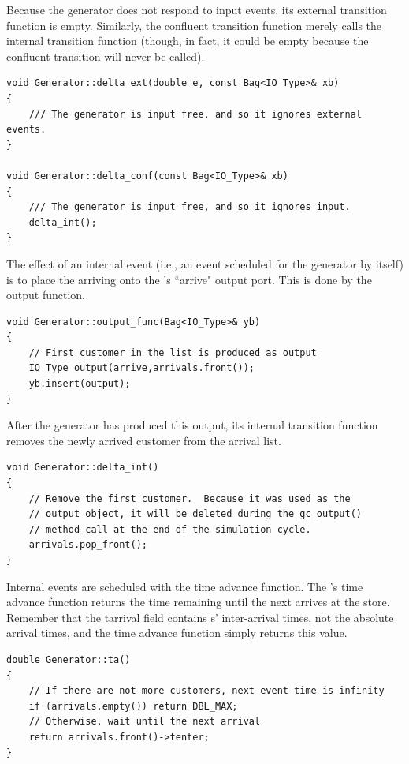 Because the generator does not respond to input events, its external transition function is empty. Similarly, the confluent transition function merely calls the internal transition function (though, in fact, it could be empty because the confluent transition will never be called).
\begin{verbatim}
void Generator::delta_ext(double e, const Bag<IO_Type>& xb)
{
    /// The generator is input free, and so it ignores external events.
}

void Generator::delta_conf(const Bag<IO_Type>& xb)
{
    /// The generator is input free, and so it ignores input.
    delta_int();
}
\end{verbatim}

The effect of an internal event (i.e., an event scheduled for the generator by itself) is to place the arriving  onto the 's ``arrive" output port. This is done by the output function.
\begin{verbatim}
void Generator::output_func(Bag<IO_Type>& yb)
{
    // First customer in the list is produced as output
    IO_Type output(arrive,arrivals.front());
    yb.insert(output);
}
\end{verbatim}
After the generator has produced this output, its internal transition function removes the newly arrived customer from the arrival list.
\begin{verbatim}
void Generator::delta_int()
{
    // Remove the first customer.  Because it was used as the
    // output object, it will be deleted during the gc_output()
    // method call at the end of the simulation cycle.
    arrivals.pop_front();
}
\end{verbatim}

Internal events are scheduled with the time advance function. The 's time advance function returns the time remaining until the next  arrives at the store. Remember that the tarrival field contains s' inter-arrival times, not the absolute arrival times, and the time advance function simply returns this value.
\begin{verbatim}
double Generator::ta()
{
    // If there are not more customers, next event time is infinity
    if (arrivals.empty()) return DBL_MAX;
    // Otherwise, wait until the next arrival
    return arrivals.front()->tenter;
}
\end{verbatim}

